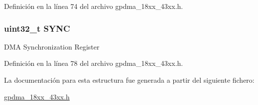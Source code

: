 Definición en la línea 74 del archivo gpdma\+\_\+18xx\+\_\+43xx.\+h.

\subsubsection[{\texorpdfstring{S\+Y\+NC}{SYNC}}]{ uint32\+\_\+t S\+Y\+NC}\hypertarget{struct_l_p_c___g_p_d_m_a___t_aaf260293f48b1c4779012028d6751b17}{}\label{struct_l_p_c___g_p_d_m_a___t_aaf260293f48b1c4779012028d6751b17}
D\+MA Synchronization Register 

Definición en la línea 78 del archivo gpdma\+\_\+18xx\+\_\+43xx.\+h.



La documentación para esta estructura fue generada a partir del siguiente fichero\+:\begin{DoxyCompactItemize}
\item 
\hyperlink{gpdma__18xx__43xx_8h}{gpdma\+\_\+18xx\+\_\+43xx.\+h}\end{DoxyCompactItemize}

